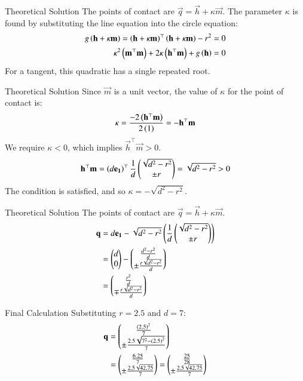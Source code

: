 \documentclass{beamer}
\begin{document}
\begin{frame}{Theoretical Solution}
The points of contact are $\vec{q} = \vec{h} + \kappa\vec{m}$. The parameter $\kappa$ is found by substituting the line equation into the circle equation:
\begin{align}
    g\left(\mathbf{h}+\kappa\mathbf{m}\right) = \left(\mathbf{h}+\kappa\mathbf{m}\right)^\top\left(\mathbf{h}+\kappa\mathbf{m}\right) - r^2 = 0 \\
    \kappa^2\left(\mathbf{m}^\top\mathbf{m}\right) + 2\kappa\left(\mathbf{h}^\top\mathbf{m}\right) + g\left(\mathbf{h}\right) = 0
\end{align}
For a tangent, this quadratic has a single repeated root.
\end{frame}

\begin{frame}{Theoretical Solution}
Since $\vec{m}$ is a unit vector, the value of $\kappa$ for the point of contact is:
\begin{align}
    \kappa = \frac{-2\left(\mathbf{h}^\top\mathbf{m}\right)}{2\left(1\right)} = -\mathbf{h}^\top\mathbf{m}
\end{align}
We require $\kappa<0$, which implies $\vec{h}^\top\vec{m}>0$.
\begin{align}
    \mathbf{h}^\top\mathbf{m} = \left(d\mathbf{e_1}\right)^\top\frac{1}{d}\begin{pmatrix}\sqrt{d^2-r^2} \\ \pm r\end{pmatrix} = \sqrt{d^2-r^2} > 0
\end{align}
The condition is satisfied, and so $\kappa = -\sqrt{d^2-r^2}$.
\end{frame}

\begin{frame}{Theoretical Solution}
The points of contact are $\vec{q} = \vec{h} + \kappa\vec{m}$.
\begin{align}
    \mathbf{q} &= d\mathbf{e_1} - \sqrt{d^2-r^2}\left(\frac{1}{d}\begin{pmatrix}\sqrt{d^2-r^2} \\ \pm r\end{pmatrix}\right) \nonumber \\
    &= \begin{pmatrix}d \\ 0\end{pmatrix} - \begin{pmatrix}\frac{d^2-r^2}{d} \\ \pm \frac{r\sqrt{d^2-r^2}}{d}\end{pmatrix} \nonumber \\
    &= \begin{pmatrix}\frac{r^2}{d} \\ \mp \frac{r\sqrt{d^2-r^2}}{d}\end{pmatrix}
\end{align}
\end{frame}

\begin{frame}{Final Calculation}
Substituting $r=2.5$ and $d=7$:
\begin{align}
    \mathbf{q} &= \begin{pmatrix}\frac{\left(2.5\right)^2}{7} \\ \pm\frac{2.5\sqrt{7^2 - \left(2.5\right)^2}}{7}\end{pmatrix} \nonumber \\
    &= \begin{pmatrix}\frac{6.25}{7} \\ \pm\frac{2.5\sqrt{42.75}}{7}\end{pmatrix} = \begin{pmatrix}\frac{25}{28} \\ \pm\frac{2.5\sqrt{42.75}}{7}\end{pmatrix}
\end{align}
\end{frame}
\end{document}
